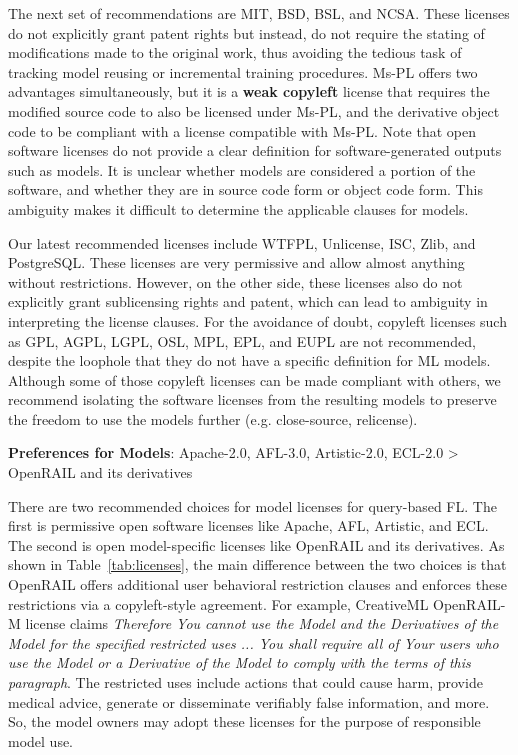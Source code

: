   The next set of recommendations are MIT, BSD, BSL, and NCSA. 
  These licenses do not explicitly grant patent rights but instead, do not require the stating of modifications made to the original work, thus avoiding the tedious task of tracking model reusing or incremental training procedures. 
  Ms-PL offers two advantages simultaneously, but it is a \textbf{weak copyleft} license that requires the modified source code to also be licensed under Ms-PL, and the derivative object code to be compliant with a license compatible with Ms-PL.
  Note that open software licenses do not provide a clear definition for software-generated outputs such as models. 
  It is unclear whether models are considered a portion of the software, and whether they are in source code form or object code form. 
  This ambiguity makes it difficult to determine the applicable clauses for models.
  
  Our latest recommended licenses include WTFPL, Unlicense, ISC, Zlib, and PostgreSQL.
  These licenses are very permissive and allow almost anything without restrictions.
  However, on the other side, these licenses also do not explicitly grant sublicensing rights and patent, which can lead to ambiguity in interpreting the license clauses.
  For the avoidance of doubt, copyleft licenses such as GPL, AGPL, LGPL, OSL, MPL, EPL, and EUPL are not recommended, despite the loophole that they do not have a specific definition for ML models.
  Although some of those copyleft licenses can be made compliant with others, we recommend isolating the software licenses from the resulting models to preserve the freedom to use the models further (e.g. close-source, relicense).
  
  \textbf{Preferences for Models}: Apache-2.0, AFL-3.0, Artistic-2.0, ECL-2.0 > OpenRAIL and its derivatives
  
  There are two recommended choices for model licenses for query-based FL. 
  The first is permissive open software licenses like Apache, AFL, Artistic, and ECL. 
  The second is open model-specific licenses like OpenRAIL and its derivatives.
  As shown in Table~\ref{tab:licenses}, the main difference between the two choices is that OpenRAIL offers additional user behavioral restriction clauses and enforces these restrictions via a copyleft-style agreement.
  For example, CreativeML OpenRAIL-M license claims \textit{Therefore You cannot use the Model and the Derivatives of the Model for the specified restricted uses ... You shall require all of Your users who use the Model or a Derivative of the Model to comply with the terms of this paragraph}.
  The restricted uses include actions that could cause harm, provide medical advice, generate or disseminate verifiably false information, and more.
  So, the model owners may adopt these licenses for the purpose of responsible model use.

